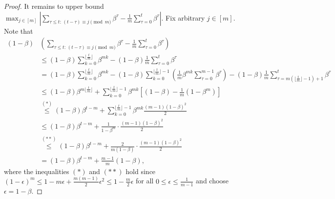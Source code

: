 \documentclass[10pt,a4paper]{amsart}
\begin{document}
\begin{proof}
    It remains to upper bound $\max_{j\in [m]}\left| \sum_{\tau\leq t:\, (t-\tau)\equiv j \pmod m}\beta^\tau - \frac 1m \sum_{\tau=0}^t \beta^\tau \right|$. Fix arbitrary $j\in [m]$. Note that
    \begin{align*}
        (1-\beta) & \left(\sum_{\tau\leq t:\, (t-\tau)\equiv j \pmod m}\beta^\tau - \frac 1m \sum_{\tau=0}^t \beta^\tau \right) \\
        &\leq  (1-\beta)\sum_{k=0}^{\lfloor \tfrac tm\rfloor} \beta^{mk} - (1-\beta) \frac 1m \sum_{\tau=0}^t \beta^\tau \\
        &= (1-\beta)\sum_{k=0}^{\lfloor \tfrac tm\rfloor} \beta^{mk} - (1-\beta) \sum_{k=0}^{\lfloor \tfrac tm\rfloor - 1}  \left(\frac 1m \beta^{mk}\sum_{\tau=0}^{m-1}\beta^\tau\right) - (1-\beta)\frac 1m \sum_{\tau=m(\lfloor \tfrac tm\rfloor-1)+1}^t \beta^\tau\\
        &\leq (1-\beta) \beta^{m\lfloor \tfrac tm\rfloor} + \sum_{k=0}^{\lfloor \tfrac tm\rfloor-1} \beta^{mk} \left[(1-\beta) - \frac{1}{m} (1-\beta^m) \right] \\
        &\overset{(*)}{\leq} (1-\beta) \beta^{t-m} + \sum_{k=0}^{\lfloor \tfrac tm\rfloor-1} \beta^{mk} \frac{(m-1)(1-\beta)^2}{2}  \\
        &\leq (1-\beta) \beta^{t-m} + \frac{1}{1-\beta^m} \cdot \frac{(m-1)(1-\beta)^2}{2} \\
        &\overset{(**)}{\leq} (1-\beta) \beta^{t-m} +  \frac{2}{m(1-\beta)} \cdot \frac{(m-1)(1-\beta)^2}{2} \\
        &= (1-\beta) \beta^{t-m} + \frac{m-1}{m} (1-\beta),
    \end{align*}
    where the inequalities $(*)$ and $(**)$ hold since $(1-\epsilon)^m \leq 1-m\epsilon+\tfrac{m(m-1)}{2}\epsilon^2 \leq 1- \tfrac m2\epsilon$ for all $0\leq \epsilon\leq \tfrac{1}{m-1}$ and choose $\epsilon = 1-\beta$.
    

\end{proof}
\end{document}
